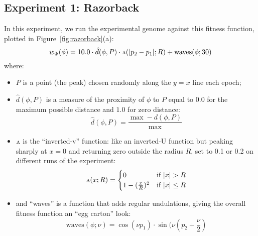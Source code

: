 \documentclass[letterpaper]{article}
\newcommand{\invv}{\ensuremath{\rotatebox[origin=c]{180}{\textrm{v}}}\xspace}
\begin{document}
%

\subsection{Experiment 1: Razorback}

In this experiment, we run the experimental genome against this fitness
function, plotted in Figure~\ref{fig:razorback}(a):
\[
   w_\Phi(\phi) = 10.0 \cdot \hat{d}(\phi, P)
                       \cdot \invv(|p_2 - p_1|; R)
                       + \text{waves}(\phi; 30)
\]
where:
\begin{itemize}
  \item[ ]
    $P$ is a point (the peak) chosen randomly along the $y=x$ line each epoch;

  \item[ ]
$\hat{d}(\phi, P)$ is a measure of the proximity of $\phi$ to $P$ equal to
$0.0$ for the maximum possible distance and $1.0$ for zero distance:
\[
  \hat{d}(\phi, P) = \frac{\max - d(\phi, P)}{\max}
\]

  \item[ ]
    \invv is the ``inverted-v'' function: like an inverted-U function but
    peaking sharply at $x=0$ and returning zero outside the radius $R$, set to
    0.1 or 0.2 on different runs of the experiment:
\[
   \invv(x; R) =
   \begin{cases}
      0 & \text{if } |x|>R \\
      1 - (\frac{x}{R})^2 &
      \text{if } |x|\leq R
   \end{cases}
\]

  \item[ ]
    and ``waves'' is a function that adds regular undulations, giving the
    overall fitness function an ``egg carton'' look:
\[
  \text{waves}(\phi; \nu) = \cos(\nu p_1)
                            \cdot
                            \sin(\nu (p_2 + \frac{\nu}{2})
\]
\end{itemize}
\end{document}
